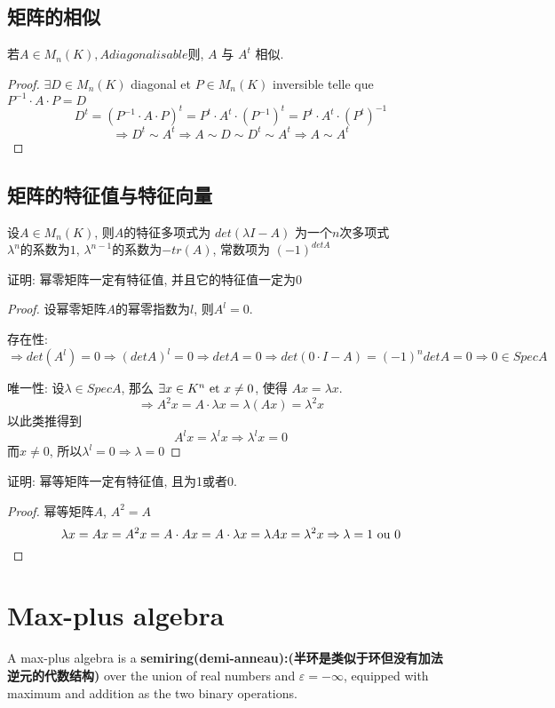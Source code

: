 \documentclass{book}
\begin{document}
\section{矩阵的相似}
若$A \in M_n(K), A diagonalisable$则, $A$ 与 $A^t$ 相似.
\begin{proof}
$\exists D \in M_n(K)$ diagonal et $P \in M_n(K)$ inversible telle que $P^{-1} \cdot A \cdot P = D$
$$ D^t = (P^{-1} \cdot A \cdot P)^t = P^t \cdot A^t \cdot (P^{-1})^t = P^t \cdot A^t \cdot (P^t)^{-1} $$
$$ \Rightarrow D^t \sim A^t \Rightarrow A \sim D \sim D^t \sim A^t \Rightarrow A \sim A^t $$
\end{proof}

\section{矩阵的特征值与特征向量}
设$A \in M_n(K)$, 则$A$的特征多项式为 $det(\lambda I - A)$ 为一个$n$次多项式 \\
$\lambda^n$的系数为$1$,
$\lambda^{n - 1}$的系数为$-tr(A)$,
常数项为 $(-1)^{detA}$

\begin{example}
证明: 幂零矩阵一定有特征值, 并且它的特征值一定为0
\end{example}
\begin{proof}
设幂零矩阵$A$的幂零指数为$l$, 则$A^l = 0$.

存在性:
$$
\Rightarrow det(A^l) = 0
\Rightarrow (detA)^l = 0
\Rightarrow detA = 0
\Rightarrow det(0 \cdot I - A) = (-1)^n detA = 0
\Rightarrow 0 \in SpecA
$$

唯一性:
设$\lambda \in SpecA$, 那么
$\exists x \in K^n \textrm{\ et } x \neq 0$, 使得 $A x = \lambda x$.
$$\Rightarrow A^2 x = A \cdot \lambda x = \lambda (Ax) = \lambda^2 x$$
以此类推得到
$$ A^l x = \lambda^l x \Rightarrow \lambda^l x = 0$$
而$x \neq 0$, 所以$\lambda^l = 0 \Rightarrow \lambda = 0$
\end{proof}

\begin{example}
证明: 幂等矩阵一定有特征值, 且为1或者0.
\end{example}
\begin{proof}
幂等矩阵$A$, $A^2 = A$
$$ \lambda x = A x = A^2 x = A \cdot Ax = A \cdot \lambda x = \lambda Ax = \lambda^2 x \Rightarrow \lambda = 1 \textrm{ ou } 0$$
\end{proof}

\chapter{Max-plus algebra}
A max-plus algebra is a \textbf{semiring(demi-anneau):(半环是类似于环但没有加法逆元的代数结构)} over the union of real numbers and
$\varepsilon = -\infty$, equipped with maximum and addition as the two binary operations.
\end{document}
